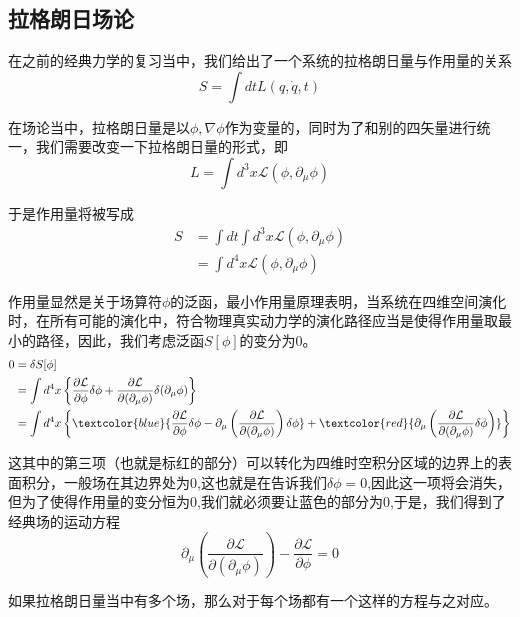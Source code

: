 \documentclass{article}
\begin{document}
\subsection{拉格朗日场论}
在之前的经典力学的复习当中，我们给出了一个系统的拉格朗日量与作用量的关系
\[S=\int dt L(q,\dot{q},t)\]

在场论当中，拉格朗日量是以$\phi,\nabla\phi$作为变量的，同时为了和别的四矢量进行统一，我们需要改变一下拉格朗日量的形式，即
\begin{equation*}
    L=\int d^3x\mathcal{L}(\phi,\partial_\mu\phi)
\end{equation*}

于是作用量将被写成
\begin{align*}
    S&=\int dt\int d^3x\mathcal{L}(\phi,\partial_\mu\phi)\\
    &=\int d^4x \mathcal{L}(\phi,\partial_\mu\phi)
\end{align*}

作用量显然是关于场算符$\phi$的泛函，最小作用量原理表明，当系统在四维空间演化时，在所有可能的演化中，符合物理真实动力学的演化路径应当是使得作用量取最小的路径，因此，我们考虑泛函$S[\phi]$的变分为$0$。
\begin{align*}
    0&=\delta S[\phi]\\
    &=\int d^4x \left\{\frac{\partial\mathcal{L}}{\partial \phi}\delta\phi+\frac{\partial \mathcal{L}}{\partial(\partial_\mu \phi)}\delta(\partial_\mu \phi)\right\}\\
    &=\int d^4x \left\{\textcolor{blue}{\frac{\partial\mathcal{L}}{\partial \phi}\delta \phi-\partial_\mu\left(\frac{\partial \mathcal{L}}{\partial(\partial_\mu\phi)}\right)\delta \phi}+\textcolor{red}{\partial_{\mu}\left(\frac{\partial \mathcal{L}}{\partial(\partial_\mu\phi)}\delta\phi\right)}\right\}
\end{align*}

这其中的第三项（也就是标红的部分）可以转化为四维时空积分区域的边界上的表面积分，一般场在其边界处为$0$,这也就是在告诉我们$\delta \phi=0$,因此这一项将会消失，但为了使得作用量的变分恒为$0$,我们就必须要让蓝色的部分为$0$,于是，我们得到了经典场的运动方程
\begin{equation*}
    \partial_\mu\left(\frac{\partial \mathcal{L}}{\partial(\partial_\mu\phi)}\right)-\frac{\partial\mathcal{L}}{\partial \phi}=0
\end{equation*}

如果拉格朗日量当中有多个场，那么对于每个场都有一个这样的方程与之对应。
\end{document}
